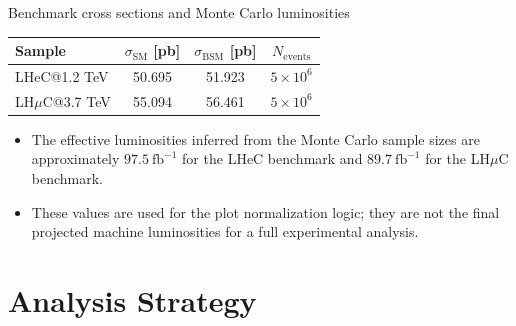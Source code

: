\documentclass[aspectratio=1610,english]{beamer}
\begin{document}
\begin{frame}{Benchmark cross sections and Monte Carlo luminosities}
\centering
\begin{tabular}{>{\raggedright\arraybackslash}p{}ccc}
\toprule
Sample & $\sigma_{\mathrm{SM}}$ [pb] & $\sigma_{\mathrm{BSM}}$ [pb] & $N_{\mathrm{events}}$ \\
\midrule
LHeC{\color{magenta}@}1.2 TeV & 50.695 & 51.923 & $5\times10^6$ \\
LH$\mu$C{\color{magenta}@}3.7 TeV & 55.094 & 56.461 & $5\times10^6$ \\
\bottomrule
\end{tabular}

\vspace{1em}
\begin{itemize}
\justifying
\item The effective luminosities inferred from the Monte Carlo sample sizes are approximately \(97.5~\mathrm{fb}^{-1}\) for the LHeC benchmark and \(89.7~\mathrm{fb}^{-1}\) for the LH$\mu$C benchmark.
\item These values are {\color{red}{Monte Carlo effective luminosities}} used for the plot normalization logic; they are not the final projected machine luminosities for a full experimental analysis.
\end{itemize}
\end{frame}


\section{Analysis Strategy}
\end{document}
